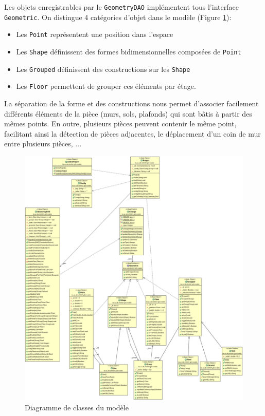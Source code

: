 	Les objets enregistrables par le \texttt{GeometryDAO} implémentent tous
	l'interface \texttt{Geometric}. On distingue 4 catégories d'objet dans le
	modèle (Figure \ref{fig:models:classdiagram}):

	\begin{itemize}
		\item Les \texttt{Point} représentent une position dans l'espace
		\item Les \texttt{Shape} définissent des formes bidimensionnelles 
		      composées de \texttt{Point}
		\item Les \texttt{Grouped} définissent des constructions sur les 
		      \texttt{Shape}
		\item Les \texttt{Floor} permettent de grouper ces éléments par étage.
	\end{itemize}

	La séparation de la forme et des constructions nous permet d'associer
	facilement différents éléments de la pièce (murs, sols, plafonds) qui sont
	bâtis à partir des mêmes points. En outre, plusieurs pièces peuvent contenir
	le même point, facilitant ainsi la détection de pièces adjacentes, le
	déplacement d'un coin de mur entre plusieurs pièces, ...

	\begin{figure}
		\includegraphics[width=\textwidth]{uml/models.png}
		\caption{\label{fig:models:classdiagram} Diagramme de classes du modèle}
	\end{figure}

